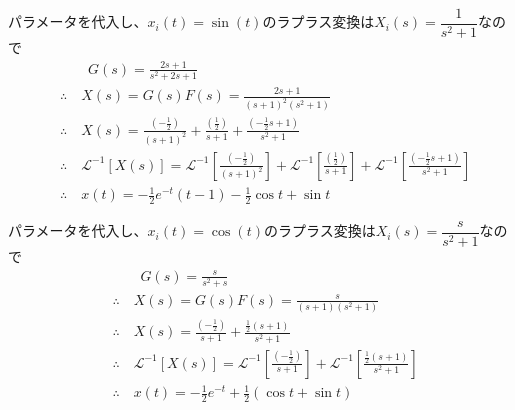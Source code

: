 \documentclass[a4paper,12pt]{article}
\begin{document}
\begin{tcolorbox}[title={5.(8)\quad \( m=1,d=2,k=1\)とし、入力\(x_i(t)=\sin (t)\) を印加したときの応答を求めよ。
    }]
    パラメータを代入し、\(x_i(t)=\sin(t)\)のラプラス変換は\(X_i(s)=\dfrac{1}{s^2+1}\)なので
    \vspace{-4mm}
    \begin{align*}
        &\qquad G(s) = \frac{2s+1}{s^2 + 2s+ 1} \\
        &\therefore \quad X(s) = G(s) F(s) = \frac{2s+1}{(s+1)^2(s^2+1)} \\
        &\therefore \quad X(s) =  \frac{\left(-\frac{1}{2}\right)}{(s+1)^2} 
        + \frac{\left(\frac{1}{2}\right)}{s+1}
        + \frac{\left(-\frac{1}{2}s+1\right)}{s^2+1}\\
        &\therefore \quad \mathcal{L}^{-1} \left[ X(s)\right] 
        = \mathcal{L}^{-1} \left[\frac{\left(-\frac{1}{2}\right)}{(s+1)^2} \right]
        + \mathcal{L}^{-1} \left[\frac{\left(\frac{1}{2}\right)}{s+1} \right]
        + \mathcal{L}^{-1} \left[\frac{\left(-\frac{1}{2}s+1\right)}{s^2+1}\right]  \\
        &\therefore \quad x(t) = -\frac{1}{2}e^{-t}(t-1)-\frac{1}{2} \cos t + \sin t
    \end{align*}
\end{tcolorbox}
\begin{tcolorbox}[title={5.(9)\quad \( m=1,d=1,k=0\)とし、入力\(x_1(t)=\cos (t)\) を印加したときの応答を求めよ。
    }]
    パラメータを代入し、\(x_i(t)=\cos(t)\)のラプラス変換は\(X_i(s)=\dfrac{s}{s^2+1}\)なので
    \vspace{-2mm}
    \begin{align*}
        &\qquad G(s) = \frac{s}{s^2 + s} \\
        &\therefore \quad X(s) = G(s) F(s) = \frac{s}{(s+1)(s^2+1)} \\
        &\therefore \quad X(s) =  \frac{\left(-\frac{1}{2}\right)}{s+1}
        + \frac{\frac{1}{2}\left(s+1\right)}{s^2+1}\\
        &\therefore \quad \mathcal{L}^{-1} \left[ X(s)\right] 
        = \mathcal{L}^{-1} \left[\frac{\left(-\frac{1}{2}\right)}{s+1} \right]
        + \mathcal{L}^{-1} \left[\frac{\frac{1}{2}\left(s+1\right)}{s^2+1} \right] \\
        &\therefore \quad x(t) = -\frac{1}{2}e^{-t} + \frac{1}{2}(\cos t + \sin t)
    \end{align*}
\end{tcolorbox}
\end{document}
